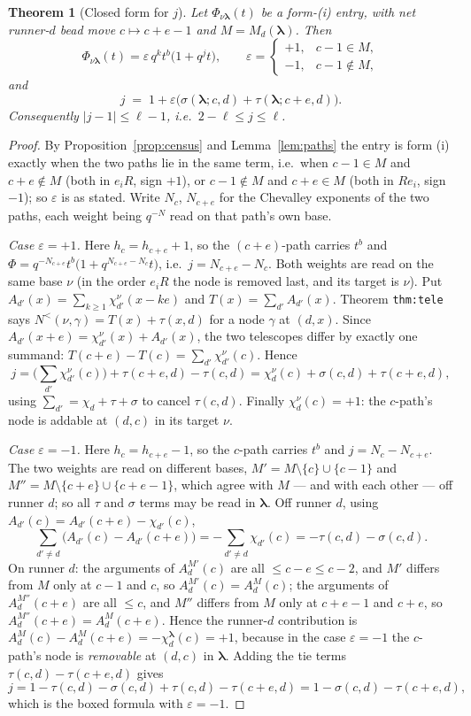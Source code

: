 \documentclass[11pt]{article}
\newtheorem{theorem}{Theorem}[section]
\theoremstyle{definition}
\theoremstyle{remark}
\newcommand{\bl}{\boldsymbol{\lambda}}
\newcommand{\Nlt}{N^{<}}
\begin{document}
\begin{theorem}[Closed form for $j$]\label{thm:j}
Let $\Phi_{\nu\bl}(t)$ be a form-(i) entry, with net runner-$d$ bead move
$c\mapsto c+e-1$ and $M=M_d(\bl)$. Then
\[
\Phi_{\nu\bl}(t)=\varepsilon\,q^{k}t^{b}\big(1+q^{j}t\big),\qquad
\varepsilon=\begin{cases}+1,& c-1\in M,\\ -1,& c-1\notin M,\end{cases}
\]
and
\[
\boxed{\;j\;=\;1+\varepsilon\Big(\sigma(\bl;c,d)+\tau(\bl;c+e,d)\Big).\;}
\]
Consequently $|j-1|\le\ell-1$, i.e.\ $2-\ell\le j\le\ell$.
\end{theorem}

\begin{proof}
By Proposition~\ref{prop:census} and Lemma~\ref{lem:paths} the entry is form (i) exactly
when the two paths lie in the same term, i.e.\ when $c-1\in M$ and $c+e\notin M$ (both in
$e_iR$, sign $+1$), or $c-1\notin M$ and $c+e\in M$ (both in $Re_i$, sign $-1$); so
$\varepsilon$ is as stated. Write $N_c$, $N_{c+e}$ for the Chevalley exponents of the two
paths, each weight being $q^{-N}$ read on that path's own base.

\emph{Case $\varepsilon=+1$.} Here $h_c=h_{c+e}+1$, so the $(c+e)$-path carries $t^{b}$
and $\Phi=q^{-N_{c+e}}t^{b}\big(1+q^{N_{c+e}-N_{c}}t\big)$, i.e.\ $j=N_{c+e}-N_{c}$.
Both weights are read on the same base $\nu$ (in the order $e_iR$ the node is removed
last, and its target is $\nu$). Put $A_{d'}(x)=\sum_{k\ge1}\chi^{\nu}_{d'}(x-ke)$ and
$T(x)=\sum_{d'}A_{d'}(x)$. Theorem \texttt{thm:tele} says $\Nlt(\nu,\gamma)=T(x)+\tau(x,d)$
for a node $\gamma$ at $(d,x)$. Since $A_{d'}(x+e)=\chi^{\nu}_{d'}(x)+A_{d'}(x)$, the two
telescopes differ by exactly one summand:
$T(c+e)-T(c)=\sum_{d'}\chi^{\nu}_{d'}(c)$. Hence
\[
j=\Big(\textstyle\sum_{d'}\chi^{\nu}_{d'}(c)\Big)+\tau(c+e,d)-\tau(c,d)
 =\chi^{\nu}_{d}(c)+\sigma(c,d)+\tau(c+e,d),
\]
using $\sum_{d'}=\chi_d+\tau+\sigma$ to cancel $\tau(c,d)$. Finally $\chi^{\nu}_d(c)=+1$:
the $c$-path's node is addable at $(d,c)$ in its target $\nu$.

\emph{Case $\varepsilon=-1$.} Here $h_c=h_{c+e}-1$, so the $c$-path carries $t^{b}$ and
$j=N_{c}-N_{c+e}$. The two weights are read on different bases,
$M'=M\setminus\{c\}\cup\{c-1\}$ and $M''=M\setminus\{c+e\}\cup\{c+e-1\}$, which agree with
$M$ --- and with each other --- off runner $d$; so all $\tau$ and $\sigma$ terms may be
read in $\bl$. Off runner $d$, using $A_{d'}(c)=A_{d'}(c+e)-\chi_{d'}(c)$,
\[
\sum_{d'\ne d}\big(A_{d'}(c)-A_{d'}(c+e)\big)=-\sum_{d'\ne d}\chi_{d'}(c)
=-\tau(c,d)-\sigma(c,d).
\]
On runner $d$: the arguments of $A^{M'}_d(c)$ are all $\le c-e\le c-2$, and $M'$ differs
from $M$ only at $c-1$ and $c$, so $A^{M'}_d(c)=A^{M}_d(c)$; the arguments of
$A^{M''}_d(c+e)$ are all $\le c$, and $M''$ differs from $M$ only at $c+e-1$ and $c+e$,
so $A^{M''}_d(c+e)=A^{M}_d(c+e)$. Hence the runner-$d$ contribution is
$A^{M}_d(c)-A^{M}_d(c+e)=-\chi^{\bl}_d(c)=+1$, because in the case $\varepsilon=-1$ the
$c$-path's node is \emph{removable} at $(d,c)$ in $\bl$. Adding the tie terms
$\tau(c,d)-\tau(c+e,d)$ gives
\[
j=1-\tau(c,d)-\sigma(c,d)+\tau(c,d)-\tau(c+e,d)=1-\sigma(c,d)-\tau(c+e,d),
\]
which is the boxed formula with $\varepsilon=-1$.


\end{proof}
\end{document}
